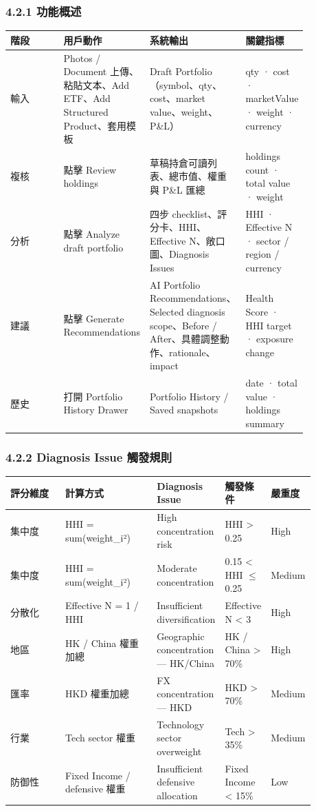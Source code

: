 \subsubsection{4.2.1 功能概述}

\begingroup
\small
\begin{longtable}{L{0.18\linewidth}L{0.24\linewidth}L{0.28\linewidth}L{0.16\linewidth}}
\toprule
\textbf{階段} & \textbf{用戶動作} & \textbf{系統輸出} & \textbf{關鍵指標} \\
\midrule
輸入 & Photos / Document 上傳、粘貼文本、Add ETF、Add Structured Product、套用模板 & Draft Portfolio（symbol、qty、cost、market value、weight、P\&L） & qty · cost · marketValue · weight · currency \\
複核 & 點擊 Review holdings & 草稿持倉可讀列表、總市值、權重與 P\&L 匯總 & holdings count · total value · weight \\
分析 & 點擊 Analyze draft portfolio & 四步 checklist、評分卡、HHI、Effective N、敞口圖、Diagnosis Issues & HHI · Effective N · sector / region / currency \\
建議 & 點擊 Generate Recommendations & AI Portfolio Recommendations、Selected diagnosis scope、Before / After、具體調整動作、rationale、impact & Health Score · HHI target · exposure change \\
歷史 & 打開 Portfolio History Drawer & Portfolio History / Saved snapshots & date · total value · holdings summary \\
\bottomrule
\end{longtable}
\endgroup

\subsubsection{4.2.2 Diagnosis Issue 觸發規則}

\begingroup
\small
\begin{longtable}{L{0.18\linewidth}L{0.30\linewidth}L{0.18\linewidth}L{0.12\linewidth}L{0.10\linewidth}}
\toprule
\textbf{評分維度} & \textbf{計算方式} & \textbf{Diagnosis Issue} & \textbf{觸發條件} & \textbf{嚴重度} \\
\midrule
集中度 & HHI = sum(weight\_i²) & High concentration risk & HHI \textgreater{} 0.25 & High \\
集中度 & HHI = sum(weight\_i²) & Moderate concentration & 0.15 \textless{} HHI \ensuremath{\le} 0.25 & Medium \\
分散化 & Effective N = 1 / HHI & Insufficient diversification & Effective N \textless{} 3 & High \\
地區 & HK / China 權重加總 & Geographic concentration — HK/China & HK / China \textgreater{} 70\% & High \\
匯率 & HKD 權重加總 & FX concentration — HKD & HKD \textgreater{} 70\% & Medium \\
行業 & Tech sector 權重 & Technology sector overweight & Tech \textgreater{} 35\% & Medium \\
防御性 & Fixed Income / defensive 權重 & Insufficient defensive allocation & Fixed Income \textless{} 15\% & Low \\
\bottomrule
\end{longtable}
\endgroup

